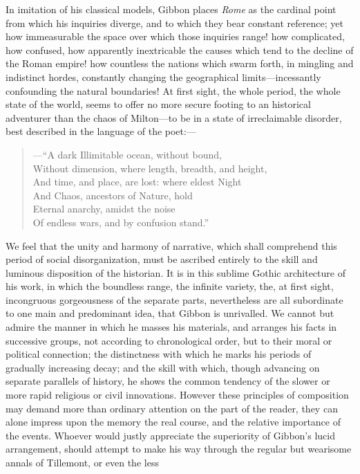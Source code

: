 In imitation of his classical models, Gibbon places \textit{Rome} as the
cardinal point from which his inquiries diverge, and to which they bear
constant reference; yet how immeasurable the space over which those
inquiries range! how complicated, how confused, how apparently inextricable
the causes which tend to the decline of the Roman empire! how countless the
nations which swarm forth, in mingling and indistinct hordes, constantly
changing the geographical limits—incessantly confounding the natural
boundaries! At first sight, the whole period, the whole state of the world,
seems to offer no more secure footing to an historical adventurer than the
chaos of Milton—to be in a state of irreclaimable disorder, best described
in the language of the poet:—
\begin{verse}
—“A dark Illimitable ocean, without bound,\\
Without dimension, where length, breadth, and height,\\
And time, and place, are lost: where eldest Night\\
And Chaos, ancestors of Nature, hold\\
Eternal anarchy, amidst the noise\\
Of endless wars, and by confusion stand.”
\end{verse}
We feel that the unity and harmony of narrative, which shall comprehend this
period of social disorganization, must be ascribed entirely to the skill and
luminous disposition of the historian. It is in this sublime Gothic
architecture of his work, in which the boundless range, the infinite variety,
the, at first sight, incongruous gorgeousness of the separate parts,
nevertheless are all subordinate to one main and predominant idea, that Gibbon
is unrivalled. We cannot but admire the manner in which he masses his materials,
and arranges his facts in successive groups, not according to chronological
order, but to their moral or political connection; the distinctness with which
he marks his periods of gradually increasing decay; and the skill with which,
though advancing on separate parallels of history, he shows the common tendency
of the slower or more rapid religious or civil innovations. However these
principles of composition may demand more than ordinary attention on the part
of the reader, they can alone impress upon the memory the real course, and the
relative importance of the events. Whoever would justly appreciate the
superiority of Gibbon’s lucid arrangement, should attempt to make his way
through the regular but wearisome annals of Tillemont, or even the less
